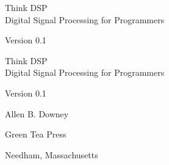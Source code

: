 \documentclass[12pt]{book}
\newcommand{\theversion}{0.1}
\begin{document}
\begin{latexonly}

\renewcommand{\blankpage}{\thispagestyle{empty} \quad \newpage}


\thispagestyle{empty}

\begin{flushright}
\vspace*{2.0in}

\begin{spacing}{3}
{\huge Think DSP}\\
{\Large Digital Signal Processing for Programmers}
\end{spacing}

\vspace{0.25in}

Version \theversion

\vfill

\end{flushright}


\blankpage
\blankpage

\pagebreak
\thispagestyle{empty}

\begin{flushright}
\vspace*{2.0in}

\begin{spacing}{3}
{\huge Think DSP}\\
{\Large Digital Signal Processing for Programmers}
\end{spacing}

\vspace{0.25in}

Version \theversion

\vspace{1in}


{\Large
Allen B. Downey\\
}


\vspace{0.5in}

{\Large Green Tea Press}

{\small Needham, Massachusetts}

\vfill

\end{flushright}


\pagebreak
\thispagestyle{empty}


\end{latexonly}
\end{document}

